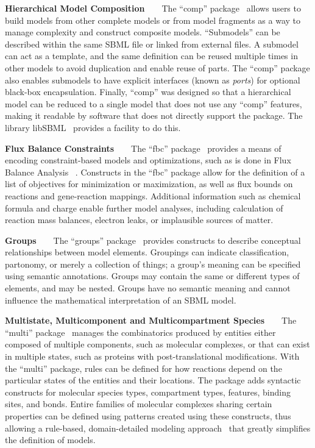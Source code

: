 \documentclass[]{draft-sbml-paper}
\begin{document}
\textbf{Hierarchical Model Composition}~~~~The ``comp'' package~\citep{Smith2015} allows users to build models from other complete models or from model fragments as a way to manage complexity and construct composite models. ``Submodels'' can be described within the same SBML file or linked from external files. A submodel can act as a template, and the same definition can be reused multiple times in other models to avoid duplication and enable reuse of parts. The ``comp'' package also enables submodels to have explicit interfaces (known as \emph{ports}) for optional black-box encapsulation. Finally, ``comp'' was designed so that a hierarchical model can be reduced to a single model that does not use any ``comp'' features,  making it readable by software that does not directly support the package. The library libSBML~\citep{bornstein2008libsbml} provides a facility to do this.

\textbf{Flux Balance Constraints}~~~~The ``fbc'' package~\citep{Olivier2018a} provides a means of encoding constraint-based models and optimizations, such as is done in Flux Balance Analysis ~\citep{Bordbar2014a}. Constructs in the ``fbc'' package allow for the definition of a list of objectives for minimization or maximization, as well as flux bounds on reactions and gene-reaction mappings. Additional information such as chemical formula and charge enable further model analyses, including calculation of reaction mass balances, electron leaks, or implausible sources of matter.

\textbf{Groups}~~~~The ``groups'' package~\citep{hucka2016sbml} provides constructs to describe conceptual relationships between model elements. Groupings can indicate classification, partonomy, or merely a collection of things; a group's meaning can be specified using semantic annotations.  Groups may contain the same or different types of elements, and may be nested. Groups have no semantic meaning and cannot influence the mathematical interpretation of an SBML model.

\textbf{Multistate, Multicomponent and Multicompartment Species}~~~~The ``multi'' package~\citep{zhang2018multi} manages the combinatorics produced by entities either composed of multiple components, such as molecular complexes, or that can exist in multiple states, such as proteins with post-translational modifications. With the ``multi'' package, rules can be defined for how reactions depend on the particular states of the entities and their locations. The package adds syntactic constructs for molecular species types, compartment types, features, binding sites, and bonds.  Entire families of molecular complexes sharing certain properties can be defined using patterns created using these constructs, thus allowing a rule-based, domain-detailed modeling approach~\citep{Blinov2004, Stefan2014multistate, Chylek2014rulebased} that greatly simplifies the definition of models.
\end{document}
